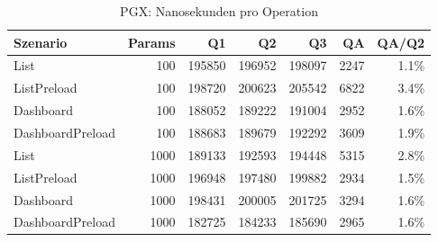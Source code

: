 \begin{table}[ht]
\centering
\caption{PGX: Nanosekunden pro Operation}
\begin{tabular}{lrrrrrr}
\toprule
Szenario & Params & Q1 & Q2 & Q3 & QA & QA/Q2 \\
\midrule
		List & 100 & 195850 & 196952 & 198097 & 2247 & 1.1\% \\
		ListPreload & 100 & 198720 & 200623 & 205542 & 6822 & 3.4\% \\
		Dashboard & 100 & 188052 & 189222 & 191004 & 2952 & 1.6\% \\
		DashboardPreload & 100 & 188683 & 189679 & 192292 & 3609 & 1.9\% \\
		List & 1000 & 189133 & 192593 & 194448 & 5315 & 2.8\% \\
		ListPreload & 1000 & 196948 & 197480 & 199882 & 2934 & 1.5\% \\
		Dashboard & 1000 & 198431 & 200005 & 201725 & 3294 & 1.6\% \\
		DashboardPreload & 1000 & 182725 & 184233 & 185690 & 2965 & 1.6\% \\
\bottomrule
\end{tabular}
\label{tab:benchmark_pgx_nsperop}
\end{table}
	